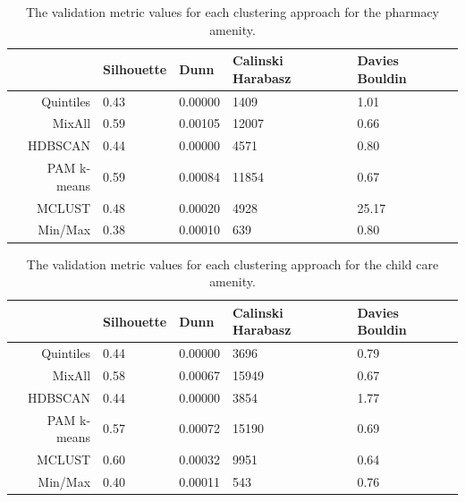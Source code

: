 \documentclass[11pt, a4paper]{article}
\begin{document}
\centering
\begin{longtable}[h]{|r|llll|}
\caption[Pharmacy validation metrics]{The validation metric values for each clustering approach for the pharmacy amenity.}\label{pharmacyvalid}
\endfirsthead
\endhead
  \hline
 & Silhouette & Dunn & Calinski Harabasz & Davies Bouldin \\ 
  \hline
Quintiles & 0.43 & 0.00000 &  1409 &  1.01 \\ 
   \hline
MixAll & \cellcolor{gray!25} 0.59 & \cellcolor{gray!25} 0.00105 & \cellcolor{gray!25}12007 & \cellcolor{gray!25} 0.66 \\ 
   \hline
HDBSCAN & 0.44 & 0.00000 &  4571 &  0.80 \\ 
   \hline
PAM k-means & \cellcolor{gray!25} 0.59 & 0.00084 & 11854 &  0.67 \\ 
   \hline
MCLUST & 0.48 & 0.00020 &  4928 & 25.17 \\ 
   \hline
Min/Max & 0.38 & 0.00010 &   639 &  0.80 \\ 
   \hline
\end{longtable}









\centering
\begin{longtable}[h]{|r|llll|}
\caption[Child care validation metrics]{The validation metric values for each clustering approach for the child care amenity.}\label{childcarevalid}
\endfirsthead
\endhead
 \hline
 & Silhouette & Dunn & Calinski Harabasz & Davies Bouldin \\ 
  \hline
Quintiles & 0.44 & 0.00000 &  3696 & 0.79 \\ 
   \hline
MixAll & 0.58 & 0.00067 & \cellcolor{gray!25} 15949 & 0.67 \\ 
   \hline
HDBSCAN & 0.44 & 0.00000 &  3854 & 1.77 \\ 
   \hline
PAM k-means & 0.57 & \cellcolor{gray!25} 0.00072 & 15190 & 0.69 \\ 
   \hline
MCLUST & \cellcolor{gray!25} 0.60 & 0.00032 &  9951 & \cellcolor{gray!25} 0.64 \\ 
   \hline
Min/Max & 0.40 & 0.00011 &   543 & 0.76 \\ 
   \hline
\end{longtable}
\end{document}
